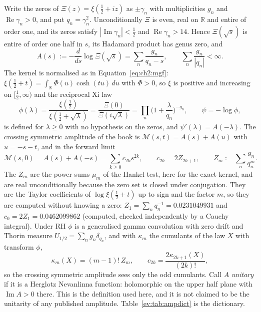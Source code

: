 Write the zeros of $\Xi(z)=\xi(\tfrac12+iz)$ as $\pm\gamma_n$ with multiplicities $g_n$ and $\operatorname{Re}\gamma_n>0$, and put $q_n=\gamma_n^2$. Unconditionally $\Xi$ is even, real on $\mathbb R$ and entire of order one, and its zeros satisfy $|\operatorname{Im}\gamma_n|<\tfrac12$ and $\operatorname{Re}\gamma_n>14$. Hence $\Xi(\sqrt s)$ is entire of order one half in $s$, its Hadamard product has genus zero, and
\begin{equation}\label{ev:eq:ampA}
A(s):=-\frac{d}{ds}\log\Xi(\sqrt s)=\sum_n\frac{g_n}{q_n-s},\qquad \sum_n\frac{g_n}{|q_n|}<\infty .
\end{equation}
The kernel is normalised as in Equation~\eqref{eq:ch2:mgf}: $\xi(\tfrac12+t)=\int_{\mathbb R}\Phi(u)\cosh(tu)\,du$ with $\Phi>0$, so $\xi$ is positive and increasing on $[\tfrac12,\infty)$ and the reciprocal Xi law
\[
\phi(\lambda)=\frac{\xi(\tfrac12)}{\xi(\tfrac12+\sqrt\lambda)}=\frac{\Xi(0)}{\Xi(i\sqrt\lambda)}=\prod_n\Big(1+\frac{\lambda}{q_n}\Big)^{-g_n},\qquad \psi=-\log\phi,
\]
is defined for $\lambda\ge0$ with no hypothesis on the zeros, and $\psi'(\lambda)=A(-\lambda)$. The crossing symmetric amplitude of the book is $\mathcal M(s,t)=A(s)+A(u)$ with $u=-s-t$, and in the forward limit
\begin{equation}\label{ev:eq:ampfwd}
\mathcal M(s,0)=A(s)+A(-s)=\sum_{k\ge0}c_{2k}s^{2k},\qquad c_{2k}=2Z_{2k+1},\qquad Z_m:=\sum_n\frac{g_n}{q_n^m}.
\end{equation}
The $Z_m$ are the power sums $\mu_m$ of the Hankel test, here for the exact kernel, and are real unconditionally because the zero set is closed under conjugation. They are the Taylor coefficients of $\log\xi(\tfrac12+t)$ up to sign and the factor $m$, so they are computed without knowing a zero: $Z_1=\sum_n q_n^{-1}=0.0231049931$ and $c_0=2Z_1=0.0462099862$ (computed, checked independently by a Cauchy integral). Under RH $\phi$ is a generalised gamma convolution with zero drift and Thorin measure $U_{1/2}=\sum_ng_n\delta_{q_n}$, and with $\kappa_m$ the cumulants of the law $X$ with transform $\phi$,
\begin{equation}\label{ev:eq:ampcum}
\kappa_m(X)=(m-1)!\,Z_m,\qquad c_{2k}=\frac{2\kappa_{2k+1}(X)}{(2k)!},
\end{equation}
so the crossing symmetric amplitude sees only the odd cumulants. Call $A$ \emph{unitary} if it is a Herglotz Nevanlinna function: holomorphic on the upper half plane with $\operatorname{Im}A>0$ there. This is the definition used here, and it is not claimed to be the unitarity of any published amplitude. Table~\ref{ev:tab:ampdict} is the dictionary.

